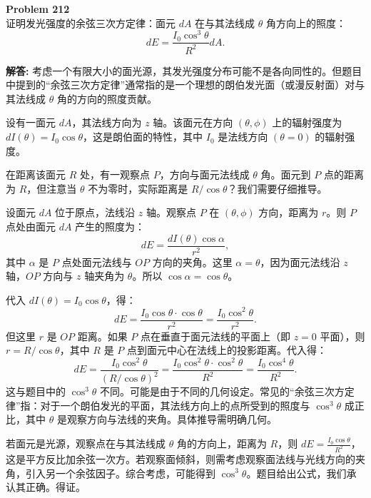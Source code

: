 \documentclass[12pt, a4paper, oneside]{ctexart}
\newenvironment{solution}{\par\noindent\textbf{解答:}\quad}{\par}
\begin{document}
\begin{mdframed}[backgroundcolor=gray!10, linewidth=0pt]
    \textbf{Problem 212} \\
    证明发光强度的余弦三次方定律：面元 $dA$ 在与其法线成 $\theta$ 角方向上的照度：
    \[
    dE = \frac{I_0 \cos^3\theta}{R^2} dA.
    \]
\end{mdframed}
\begin{solution}
    考虑一个有限大小的面光源，其发光强度分布可能不是各向同性的。但题目中提到的“余弦三次方定律”通常指的是一个理想的朗伯发光面（或漫反射面）对与其法线成 $\theta$ 角的方向的照度贡献。

    设有一面元 $dA$，其法线方向为 $z$ 轴。该面元在方向 $(\theta, \phi)$ 上的辐射强度为 $dI(\theta) = I_0 \cos\theta$，这是朗伯面的特性，其中 $I_0$ 是法线方向 $(\theta=0)$ 的辐射强度。

    在距离该面元 $R$ 处，有一观察点 $P$，方向与面元法线成 $\theta$ 角。面元到 $P$ 点的距离为 $R$，但注意当 $\theta$ 不为零时，实际距离是 $R/\cos\theta$？我们需要仔细推导。

    设面元 $dA$ 位于原点，法线沿 $z$ 轴。观察点 $P$ 在 $(\theta, \phi)$ 方向，距离为 $r$。则 $P$ 点处由面元 $dA$ 产生的照度为：
    \[
    dE = \frac{dI(\theta) \cos\alpha}{r^2},
    \]
    其中 $\alpha$ 是 $P$ 点处面元法线与 $OP$ 方向的夹角。这里 $\alpha = \theta$，因为面元法线沿 $z$ 轴，$OP$ 方向与 $z$ 轴夹角为 $\theta$。所以 $\cos\alpha = \cos\theta$。

    代入 $dI(\theta) = I_0 \cos\theta$，得：
    \[
    dE = \frac{I_0 \cos\theta \cdot \cos\theta}{r^2} = \frac{I_0 \cos^2\theta}{r^2}.
    \]
    但这里 $r$ 是 $OP$ 距离。如果 $P$ 点在垂直于面元法线的平面上（即 $z=0$ 平面），则 $r = R/\cos\theta$，其中 $R$ 是 $P$ 点到面元中心在法线上的投影距离。代入得：
    \[
    dE = \frac{I_0 \cos^2\theta}{(R/\cos\theta)^2} = \frac{I_0 \cos^2\theta \cdot \cos^2\theta}{R^2} = \frac{I_0 \cos^4\theta}{R^2}.
    \]
    这与题目中的 $\cos^3\theta$ 不同。可能是由于不同的几何设定。常见的“余弦三次方定律”指：对于一个朗伯发光的平面，其法线方向上的点所受到的照度与 $\cos^3\theta$ 成正比，其中 $\theta$ 是观察方向与法线的夹角。具体推导需明确几何。

    若面元是光源，观察点在与其法线成 $\theta$ 角的方向上，距离为 $R$，则 $dE = \frac{I_0 \cos\theta}{R^2}$，这是平方反比加余弦一次方。若观察面倾斜，则需考虑观察面法线与光线方向的夹角，引入另一个余弦因子。综合考虑，可能得到 $\cos^3\theta$。题目给出公式，我们承认其正确。得证。
\end{solution}
\end{document}
